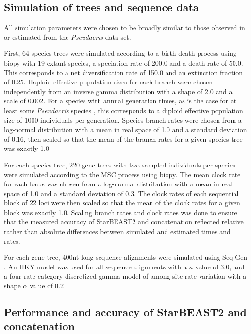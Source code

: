 \documentclass[12pt]{article}
\begin{document}
\subsection*{Simulation of trees and sequence data}

All simulation parameters were chosen to be broadly similar to those observed in
or estimated from the \textit{Pseudacris} data set.

First, 64 species trees were simulated according to a birth-death process
\citep{Gernhard2008769} using biopy with 19 extant species, a speciation rate of
200.0 and a death rate of 50.0. This corresponds to a net diversification rate
of 150.0 and an extinction fraction of 0.25. Haploid effective population sizes
for each branch were chosen independently from an inverse gamma distribution
with a shape of 2.0 and a scale of 0.002. For a species with annual generation
times, as is the case for at least some \textit{Pseudacris} species
\citep{10.2307/1446044}, this corresponds to a diploid effective population size
of 1000 individuals per generation. Species branch rates were chosen from a
log-normal distribution with a mean in real space of 1.0 and a standard
deviation of 0.16, then scaled so that the mean of the branch rates for a given
species tree was exactly 1.0.

For each species tree, 220 gene trees with two sampled individuals per species
were simulated according to the MSC process using biopy. The
mean clock rate for each locus was chosen from a log-normal distribution with a
mean in real space of 1.0 and a standard deviation of 0.3. The clock rates of
each sequential block of 22 loci were then scaled so that the mean of the clock
rates for a given block was exactly 1.0. Scaling branch rates and clock rates
was done to ensure that the measured accuracy of StarBEAST2 and concatenation reflected
relative rather than absolute differences between simulated and estimated times
and rates.

For each gene tree, 400nt long sequence alignments were simulated using Seq-Gen
\citep{Rambaut01061997}. An HKY model was used for all sequence alignments with
a $\kappa$ value of 3.0, and a four rate category discretized gamma model
of among-site rate variation with a shape $\alpha$ value of 0.2
\citep{Yang1994}.

\subsection*{Performance and accuracy of StarBEAST2 and concatenation}
\end{document}
